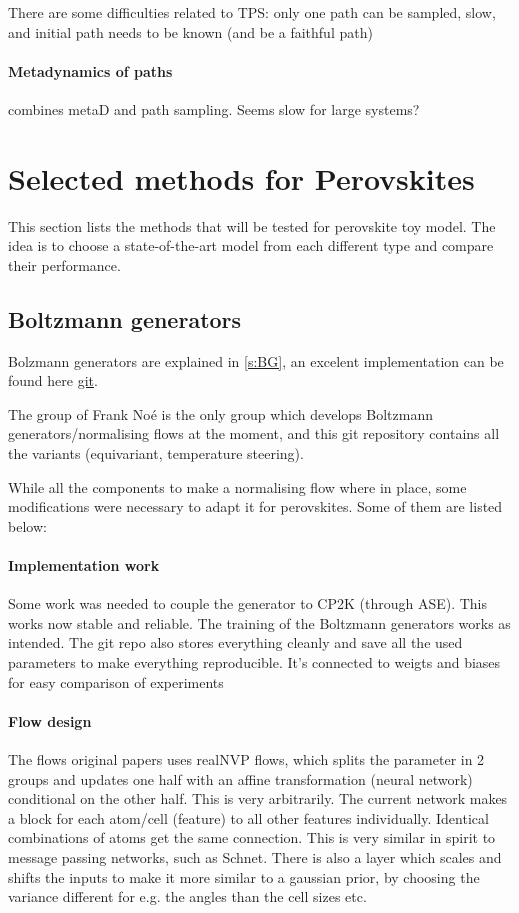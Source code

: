 \documentclass{article}
\begin{document}
There are some difficulties related to TPS: only one path can be sampled, slow, and initial path needs to be known (and be a faithful path)

\paragraph{Metadynamics of paths} \cite{Mandelli2020} combines metaD and path sampling. Seems slow for large systems?

\section{Selected methods for Perovskites}\label{s:mp}

This section lists the methods that will be tested for perovskite toy model. The idea is to choose a state-of-the-art model from each different type and compare their performance.

\subsection{Boltzmann generators}

Bolzmann generators are explained in \cref{s:BG}, an excelent implementation can be found here \href{https://github.com/noegroup/bgflow}{git}.

The group of Frank Noé is the only group which develops Boltzmann generators/normalising flows at the moment, and this git repository contains all the variants (equivariant, temperature steering).

While all the components to make a normalising flow where in place, some modifications were necessary to adapt it for perovskites. Some of them are listed below:

\paragraph{Implementation work} Some work was needed to couple the generator to CP2K (through ASE). This works now stable and reliable. The training of the Boltzmann generators works as intended. The git repo also stores everything cleanly and save all the used parameters to make everything reproducible. It's connected to weigts and biases for easy comparison of experiments

\paragraph{Flow design} The flows original papers uses realNVP flows, which splits the parameter in 2 groups and updates one half with an affine transformation (neural network) conditional on the other half. This is very arbitrarily. The current network makes a block for each atom/cell (feature) to all other features individually. Identical combinations of atoms get the same connection. This is very similar in spirit to message passing networks, such as Schnet. There is also a layer which scales and shifts the inputs to make it more similar to a gaussian prior, by choosing the variance different for e.g. the angles than the cell sizes etc.
\end{document}
